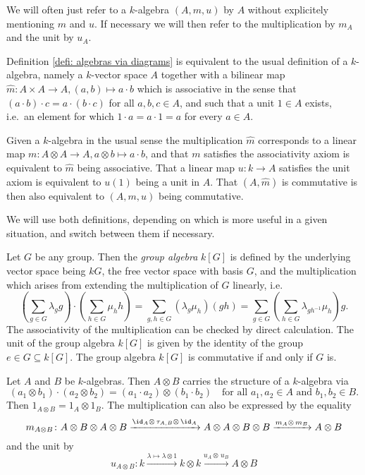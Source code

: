 \begin{remark}
 We will often just refer to a $k$-algebra $(A,m,u)$ by $A$ without explicitely mentioning $m$ and $u$. If necessary we will then refer to the multiplication by $m_A$ and the unit by $u_A$.
\end{remark}


\begin{remark}
 Definition \ref{defi: algebras via diagrams} is equivalent to the usual definition of a $k$-algebra, namely a $k$-vector space $A$ together with a bilinear map $\hat{m} \colon A \times A \to A, (a,b) \mapsto a \cdot b$ which is associative in the sense that $(a \cdot b) \cdot c = a \cdot (b \cdot c)$ for all $a,b,c \in A$, and such that a unit $1 \in A$ exists, i.e.\ an element for which $1 \cdot a = a \cdot 1 = a$ for every $a \in A$.
 
 Given a $k$-algebra in the usual sense the multiplication $\hat{m}$ corresponds to a linear map $m \colon A \otimes A \to A, a \otimes b \mapsto a \cdot b$, and that $m$ satisfies the associativity axiom is equivalent to $\hat{m}$ being associative. That a linear map $u \colon k \to A$ satisfies the unit axiom is equivalent to $u(1)$ being a unit in $A$. That $(A,\hat{m})$ is commutative is then also equivalent to $(A,m,u)$ being commutative.
 
 We will use both definitions, depending on which is more useful in a given situation, and switch between them if necessary.
\end{remark}


\begin{example}
 Let $G$ be any group. Then the \emph{group algebra} $k[G]$ is defined by the underlying vector space being $kG$, the free vector space with basis $G$, and the multiplication which arises from extending the multiplication of $G$ linearly, i.e.
 \[
  \left( \sum_{g \in G} \lambda_g g \right) \cdot \left( \sum_{h \in G} \mu_h h \right)
  = \sum_{g,h \in G} (\lambda_g \mu_h) (gh)
  = \sum_{g \in G} \left( \sum_{h \in G} \lambda_{gh^{-1}} \mu_h \right) g.
 \]
 The associativity of the multiplication can be checked by direct calculation. The unit of the group algebra $k[G]$ is given by the identity of the group $e \in G \subseteq k[G]$. The group algebra $k[G]$ is commutative if and only if $G$ is.
\end{example}


\begin{example}
 Let $A$ and $B$ be $k$-algebras. Then $A \otimes B$ carries the structure of a $k$-algebra via
 \[
  (a_1 \otimes b_1) \cdot (a_2 \otimes b_2)
  = (a_1 \cdot a_2) \otimes (b_1 \cdot b_2)
  \quad\text{for all $a_1, a_2 \in A$ and $b_1, b_2 \in B$}.
 \]
 Then $1_{A \otimes B} = 1_A \otimes 1_B$. The multiplication can also be expressed by the equality
 \[
  m_{A \otimes B} \colon
  A \otimes B \otimes A \otimes B
  \xrightarrow{\id_A \otimes\, \tau_{A,B} \otimes\, \id_A}
  A \otimes A \otimes B \otimes B
  \xrightarrow{m_A \otimes\, m_B}
  A \otimes B
 \]
 and the unit by
 \[
  u_{A \otimes B} \colon
  k
  \xrightarrow{\lambda \mapsto \lambda \otimes 1}
  k \otimes k
  \xrightarrow{u_A \otimes\, u_B}
  A \otimes B
 \]
\end{example}



